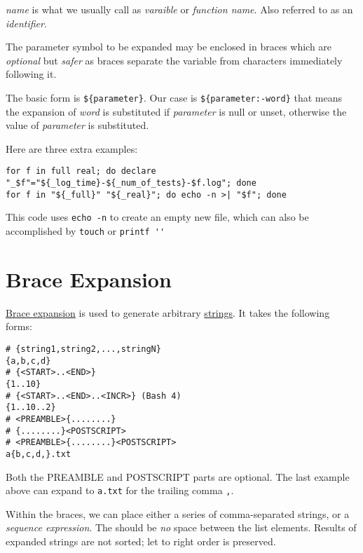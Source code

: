 \textit{name} is what we usually call as \textit{varaible} or
\textit{function name}. Also referred to as an
\textit{identifier}.

The parameter symbol to be expanded may be enclosed in braces
which are \textit{optional} but \textit{safer} as braces separate
the variable from characters immediately following it.

The basic form is
\lstinline|${parameter}|. Our case is
\lstinline|${parameter:-word}| that means the expansion of
\textit{word} is substituted if \textit{parameter} is null or
unset, otherwise the value of \textit{parameter} is substituted.

Here are three extra examples:

\begin{minipage}{1.0\linewidth}
\begin{lstlisting}
for f in full real; do declare "_$f"="${_log_time}-${_num_of_tests}-$f.log"; done
for f in "${_full}" "${_real}"; do echo -n >| "$f"; done  
\end{lstlisting}
\end{minipage}

This code uses \lstinline|echo -n| to create an empty new
file, which can also be accomplished by \lstinline|touch| or
\lstinline|printf ''|

\section{Brace Expansion}
\label{sec:brace-expansion}

\href{https://wiki.bash-hackers.org/syntax/expansion/brace}{Brace
  expansion} is used to generate arbitrary \uline{strings}. It
takes the following forms:

\begin{lstlisting}
# {string1,string2,...,stringN}
{a,b,c,d}
# {<START>..<END>}
{1..10}
# {<START>..<END>..<INCR>} (Bash 4)
{1..10..2}
# <PREAMBLE>{........}
# {........}<POSTSCRIPT>
# <PREAMBLE>{........}<POSTSCRIPT>
a{b,c,d,}.txt
\end{lstlisting}

Both the PREAMBLE and POSTSCRIPT parts are optional. The last
example above can expand to \verb|a.txt| for the trailing
comma \lstinline|,|.

Within the braces, we can place either a series of comma-separated
strings, or a \textit{sequence expression}. The should be
\textit{no} space between the list elements. Results of expanded
strings are not sorted; let to right order is preserved.

